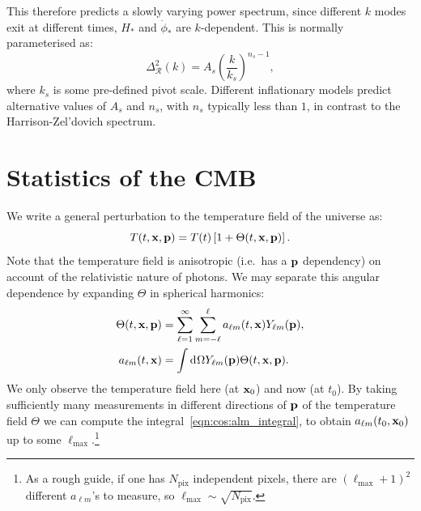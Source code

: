 This therefore predicts a slowly varying power spectrum, since different $k$ modes exit at different times, $H_*$ and $\dot{\phi}_*$ are $k$-dependent. This is normally parameterised as:
\begin{equation}
  \Delta_\mathcal{R}^2(k) = A_s {\left( \frac{k}{k_s} \right)}^{n_s-1},
  \label{eqn:cos:lcdm_power}
\end{equation}
where $k_s$ is some pre-defined pivot scale.
Different inflationary models predict alternative values of $A_s$ and $n_s$, with $n_s$ typically less than $1$, in contrast to the Harrison-Zel'dovich spectrum.








\section{Statistics of the CMB}
We write a general perturbation to the temperature field of the universe as:
\begin{equation}
  T(t,\mathbf{x},\mathbf{p}) = T(t)\left[ 1+\Theta(t,\mathbf{x},\mathbf{p}) \right].
\end{equation}
Note that the temperature field is anisotropic (i.e.\ has a $\mathbf{p}$ dependency) on account of the relativistic nature of photons. We may separate this angular dependence by expanding $\Theta$ in spherical harmonics:
\begin{align}
  \Theta(t,\mathbf{x},\mathbf{p}) &= \sum_{\ell=1}^{\infty}\sum_{m=-\ell}^{\ell}a_{\ell m}(t,\mathbf{x}) Y_{\ell m}(\mathbf{p}),\\
  a_{\ell m}(t,\mathbf{x}) &= \int \operatorname{d}^{}\!{\Omega} Y_{\ell m}(\mathbf{p}) \Theta(t,\mathbf{x},\mathbf{p}).
  \label{eqn:cos:alm_integral}
\end{align}
We only observe the temperature field here (at $\mathbf{x}_0$) and now (at $t_0$). By taking sufficiently many measurements in different directions of $\mathbf{p}$ of the temperature field $\Theta$ we can compute the integral~\eqref{eqn:cos:alm_integral}, to obtain $a_{\ell m}(t_0,\mathbf{x}_0)$ up to some $\ell_{\max{}}$.\footnote{As a rough guide, if one has $N_\mathrm{pix}$ independent pixels, there are ${(\ell_{\max{}}+1)}^2$ different $a_{\ell m}$'s to measure, so $\ell_{\max{}} \sim \sqrt{N_\mathrm{pix}}$.}


